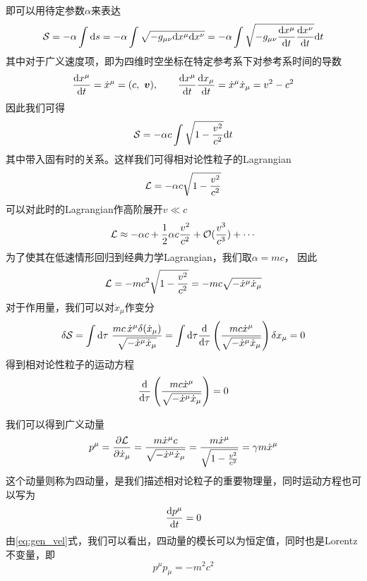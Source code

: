 \documentclass[a4paper]{report}
\begin{document}
即可以用待定参数$\alpha$来表达
\begin{equation}
    \mathcal{S} = -\alpha\int\mathrm{d} s = -\alpha\int\sqrt{-g_{\mu\nu}\mathrm{d} x^\mu \mathrm{d} x^\nu} = -\alpha\int \sqrt{-g_{\mu\nu}\frac{\mathrm{d} x^\mu}{\mathrm{d} t}\frac{\mathrm{d} x^\nu}{\mathrm{d} t}}\mathrm{d} t
\end{equation}
其中对于广义速度项，即为四维时空坐标在特定参考系下对参考系时间的导数
\begin{equation}
    \frac{\mathrm{d} x^\mu}{\mathrm{d} t} = \dot x^\mu = (c, ~\boldsymbol{v}), \qquad\frac{\mathrm{d} x^\mu}{\mathrm{d} t}\frac{\mathrm{d} x_\mu}{\mathrm{d} t} =\dot x^\mu \dot x_\mu= v^2 -c^2\label{eq:gen_vel}
\end{equation}
因此我们可得
\begin{equation}
    \mathcal{S} =  -\alpha c \int\sqrt{1-\frac{v^2}{c^2}} \mathrm{d} t
\end{equation}
其中带入固有时的关系。这样我们可得相对论性粒子的Lagrangian
\begin{equation}
    \mathcal{L} = -\alpha c\sqrt{1-\frac{v^2}{c^2}}
\end{equation}
可以对此时的Lagrangian作高阶展开$v\ll c$
\begin{equation}
    \mathcal{L} \approx -\alpha c + \frac{1}{2}\alpha c\frac{v^2}{c^2} + \mathcal{O}(\frac{v^3}{c^3})+\cdots
\end{equation}
为了使其在低速情形回归到经典力学Lagrangian，我们取$\alpha = m c$， 因此
\begin{equation}
     \mathcal{L} = -m c^2\sqrt{1-\frac{v^2}{c^2}} = -mc\sqrt{-\dot x^\mu \dot x_\mu}
\end{equation}
对于作用量，我们可以对$\dot x_\mu$作变分
\begin{equation}
    \delta\mathcal{S} = \int\mathrm{d}\tau~\frac{mc\,\dot x^\mu\delta(\dot x_\mu)}{\sqrt{-\dot x^\mu \dot x_\mu}}=\int\mathrm{d}\tau \frac{\mathrm{d}}{\mathrm{d}\tau}\left( \frac{mc \dot x^\mu}{\sqrt{-\dot x^\mu \dot x_\mu}} \right)\delta x_\mu = 0
\end{equation}
得到相对论性粒子的运动方程
\begin{equation}
    \frac{\mathrm{d}}{\mathrm{d}\tau}\left( \frac{mc \dot x^\mu}{\sqrt{-\dot x^\mu \dot x_\mu}} \right) = 0
\end{equation}

我们可以得到广义动量
\begin{equation}
    p^\mu = \frac{\partial\mathcal{L}}{\partial \dot x_\mu} = \frac{m\dot x^\mu c}{\sqrt{-\dot x^\mu \dot x_\mu}} = \frac{m\dot x^\mu}{\sqrt{1-\frac{v^2}{c^2}}} = \gamma m \dot x^\mu
\end{equation}
这个动量则称为四动量，是我们描述相对论粒子的重要物理量，同时运动方程也可以写为
\begin{equation}
    \frac{\mathrm{d} p^\mu}{\mathrm{d} t} = 0
\end{equation}
由\eqref{eq:gen_vel}式，我们可以看出，四动量的模长可以为恒定值，同时也是Lorentz不变量，即
\begin{equation}
    p^\mu p_\mu = - m^2 c^2
\end{equation}
\end{document}
